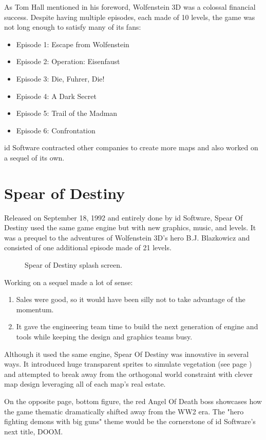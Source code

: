 \documentclass[book.tex]{subfiles}
\begin{document}
As Tom Hall mentioned in his foreword, Wolfenstein 3D was a colossal financial success. Despite having multiple episodes, each made of 10 levels, the game was not long enough to satisfy many of its fans:\\
\begin{itemize}
\item Episode 1: Escape from Wolfenstein
\item Episode 2: Operation: Eisenfaust
\item Episode 3: Die, Fuhrer, Die!
\item Episode 4: A Dark Secret
\item Episode 5: Trail of the Madman
\item Episode 6: Confrontation
\end{itemize}
id Software contracted other companies to create more maps and also worked on a sequel of its own.

\section{Spear of Destiny}
Released on September 18, 1992 and entirely done by id Software, Spear Of Destiny used the same game engine but with new graphics, music, and levels. It was a prequel to the adventures of Wolfenstein 3D's hero B.J. Blazkowicz and consisted of one additional episode made of 21 levels.\\
   \par
\begin{figure}[H]
\centering
 \caption{Spear of Destiny splash screen.}
 \end{figure}
 \par
 Working on a sequel made a lot of sense:
 \begin{enumerate}
 \item Sales were good, so it would have been silly not to take advantage of the momentum.
 \item It gave the engineering team time to build the next generation of engine and tools while keeping the design and graphics teams busy.
 \end{enumerate}
Although it used the same engine, Spear Of Destiny was innovative in several ways. It introduced huge transparent sprites to simulate vegetation (see page \pageref{spears_of_destiny_play}) and attempted to break away from the orthogonal world constraint with clever map design leveraging all of each map's real estate.\\
    \par
On the opposite page, bottom figure, the red Angel Of Death boss showcases how the game thematic dramatically shifted away from the WW2 era. The "hero fighting demons with big guns" theme would be the cornerstone of id Software's next title, DOOM. 
\begin{figure}[H]
\centering
 \end{figure}
 \par
 \label{spears_of_destiny_play}
 \begin{figure}[H]
\centering
 \end{figure}
\end{document}
